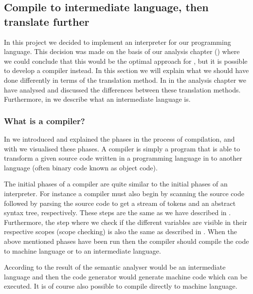 \subsection{Compile to intermediate language, then translate further}
\label{sec:compiletointermediate}

In this project we decided to implement an interpreter for our programming
language. This decision was made on the basis of our analysis chapter
() where we could conclude that this would be the optimal
approach for \productname{}, but it is possible to develop a compiler instead. In
this section we will explain what we should have done differently in terms of
the translation method. In  in the
analysis chapter we have analysed and discussed the differences between these
translation methods. Furthermore, in  we
describe what an intermediate language is.

\subsubsection{What is a compiler?}

In  we introduced and explained the phases in the
process of compilation, and with  we visualised
these phases. A compiler is simply a program that is able to transform a given
source code written in a programming language in to another language (often
binary code known as object code).

The initial phases of a compiler are quite similar to the initial phases of an
interpreter. For instance a compiler must also begin by scanning the source code
followed by parsing the source code to get a stream of tokens and an abstract
syntax tree, respectively. These steps are the same as we have described in
. Furthermore, the step where we check if the
different variables are visible in their respective scopes (scope checking) is
also the same as described in . When the above
mentioned phases have been run then the compiler should compile the code to
machine language or to an intermediate language.

According to  the result of the semantic analyser
would be an intermediate language and then the code generator would generate
machine code which can be executed. It is of course also possible to compile
directly to machine language.

